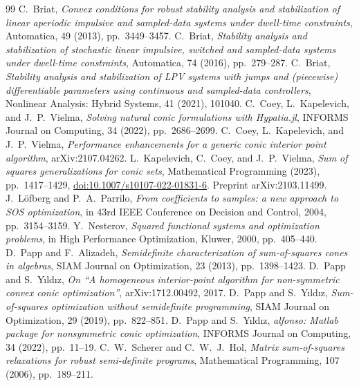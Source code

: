 \documentclass[11pt,a4paper]{article}
\begin{document}
\begin{thebibliography}{99}\small
{} C.~Briat, \emph{Convex conditions for robust stability analysis and stabilization of linear aperiodic impulsive and sampled-data systems under dwell-time constraints}, Automatica, 49 (2013), pp.~3449--3457.
 C.~Briat, \emph{Stability analysis and stabilization of stochastic linear impulsive, switched and sampled-data systems under dwell-time constraints}, Automatica, 74 (2016), pp.~279--287.
 C.~Briat, \emph{Stability analysis and stabilization of LPV systems with jumps and (piecewise) differentiable parameters using continuous and sampled-data controllers}, Nonlinear Analysis: Hybrid Systems, 41 (2021), 101040.
 C.~Coey, L.~Kapelevich, and J.~P.~Vielma, \emph{Solving natural conic formulations with Hypatia.jl}, INFORMS Journal on Computing, 34 (2022), pp.~2686--2699.
 C.~Coey, L.~Kapelevich, and J.~P.~Vielma, \emph{Performance enhancements for a generic conic interior point algorithm}, arXiv:2107.04262.
 L.~Kapelevich, C.~Coey, and J.~P.~Vielma, \emph{Sum of squares generalizations for conic sets}, Mathematical Programming (2023), pp.~1417--1429, \href{https://doi.org/10.1007/s10107-022-01831-6}{doi:10.1007/s10107-022-01831-6}. Preprint arXiv:2103.11499.
 J.~L\"ofberg and P.~A.~Parrilo, \emph{From coefficients to samples: a new approach to SOS optimization}, in 43rd IEEE Conference on Decision and Control, 2004, pp.~3154--3159.
 Y.~Nesterov, \emph{Squared functional systems and optimization problems}, in High Performance Optimization, Kluwer, 2000, pp.~405--440.
 D.~Papp and F.~Alizadeh, \emph{Semidefinite characterization of sum-of-squares cones in algebras}, SIAM Journal on Optimization, 23 (2013), pp.~1398--1423.
 D.~Papp and S.~Y{\i}ld{\i}z, \emph{On ``A homogeneous interior-point algorithm for non-symmetric convex conic optimization''}, arXiv:1712.00492, 2017.
 D.~Papp and S.~Y{\i}ld{\i}z, \emph{Sum-of-squares optimization without semidefinite programming}, SIAM Journal on Optimization, 29 (2019), pp.~822--851.
 D.~Papp and S.~Y{\i}ld{\i}z, \emph{alfonso: Matlab package for nonsymmetric conic optimization}, INFORMS Journal on Computing, 34 (2022), pp.~11--19.
 C.~W.~Scherer and C.~W.~J.~Hol, \emph{Matrix sum-of-squares relaxations for robust semi-definite programs}, Mathematical Programming, 107 (2006), pp.~189--211.

\end{thebibliography}
\end{document}
